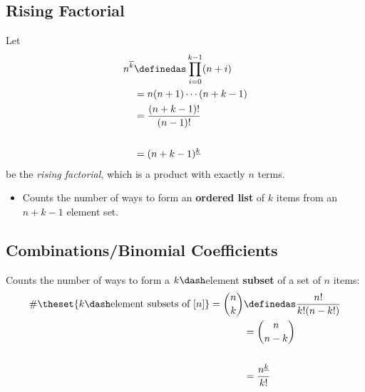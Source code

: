 \hypertarget{rising-factorial}{%
\subsection{Rising Factorial}\label{rising-factorial}}

Let
\begin{align*}\begin{aligned}
n^{\overline k} &\definedas \prod_{i=0}^{k-1}(n+i) \\ &=n(n+1) \cdots (n+k-1)
\\&= \frac{(n+k-1)!}{(n-1)!} \\ \\&= (n+k-1)^{\underline k}
\end{aligned}\end{align*} be the \emph{rising factorial}, which is a
product with exactly \(n\) terms.

\begin{itemize}
\tightlist
\item
  Counts the number of ways to form an \textbf{ordered list} of \(k\)
  items from an \(n+k-1\) element set.
\end{itemize}

\hypertarget{combinationsbinomial-coefficients}{%
\subsection{Combinations/Binomial
Coefficients}\label{combinationsbinomial-coefficients}}

Counts the number of ways to form a \(k\dash\)element \textbf{subset} of
a set of \(n\) items:
\begin{align*}
\begin{aligned}
\#\theset{k\dash\text{element subsets of } [n]} = {n \choose k} &\definedas \frac{n!}{k!(n-k!)} \\
&= {n \choose n-k} \\ \\
&= \frac{n^{\underline k}}{k!}
\end{aligned}
\end{align*}

